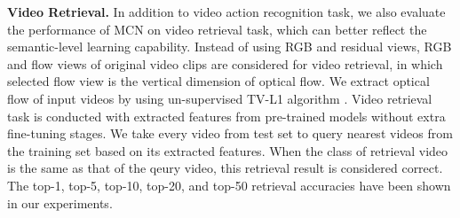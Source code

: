 \documentclass[10pt,twocolumn,letterpaper]{article}
\begin{document}
\begin{table}[htbp]
		\centering
{}
		\vspace{0.07cm}
		\caption{Comparisons with state-of-the-art approaches for video retrieval on HMDB51 dataset.}
		\label{tab:video_retrieval_hmdb51}
\end{table}



\textbf{Video Retrieval.} In addition to video action recognition task, we also evaluate the performance of MCN on video retrieval task, which can better reflect the semantic-level learning capability. Instead of using RGB and residual views, RGB and flow views of original video clips are considered for video retrieval, in which selected flow view is the vertical dimension of optical flow. We extract optical flow of input videos by using un-supervised TV-L1 algorithm \cite{geiger2012we}. Video retrieval task is conducted with extracted features from pre-trained models without extra fine-tuning stages. We take every video from test set to query  nearest videos from the training set based on its extracted features. When the class of retrieval video is the same as that of the qeury video, this retrieval result is considered correct. The top-1, top-5, top-10, top-20, and top-50 retrieval accuracies have been shown in our experiments.
\end{document}
